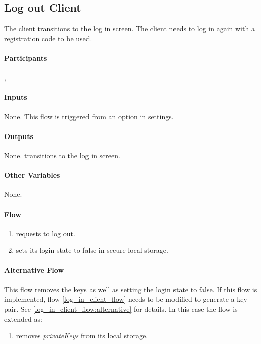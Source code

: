 \documentclass[a4paper,10pt,draft]{article}
\newcommand{\privateKeys}{\emph{privateKeys}}
\begin{document}
\subsection{Log out Client}
\label{log_out_client_flow}
The client transitions to the log in screen. The client needs to log in again with a registration code to be used.

\paragraph{Participants} \Client{}, \User{}

\paragraph{Inputs}
None. This flow is triggered from an option in settings.

\paragraph{Outputs}
None. \Client{} transitions to the log in screen.

\paragraph{Other Variables}
None.

\paragraph{Flow}

\begin{enumerate}
 \item \User{} requests to log out.
 \item \Client{} sets its login state to false in secure local storage.
\end{enumerate}

\paragraph{Alternative Flow}
\label{log_out_client_flow:alternative}

This flow removes the keys as well as setting the login state to false. If this flow is implemented, flow \ref{log_in_client_flow} needs to be modified to generate a key pair. See 
\ref{log_in_client_flow:alternative} for details. In this case the flow is extended as:

\begin{enumerate}[resume]
 \item \Client{} removes \privateKeys{} from its local storage.
\end{enumerate}
\end{document}

